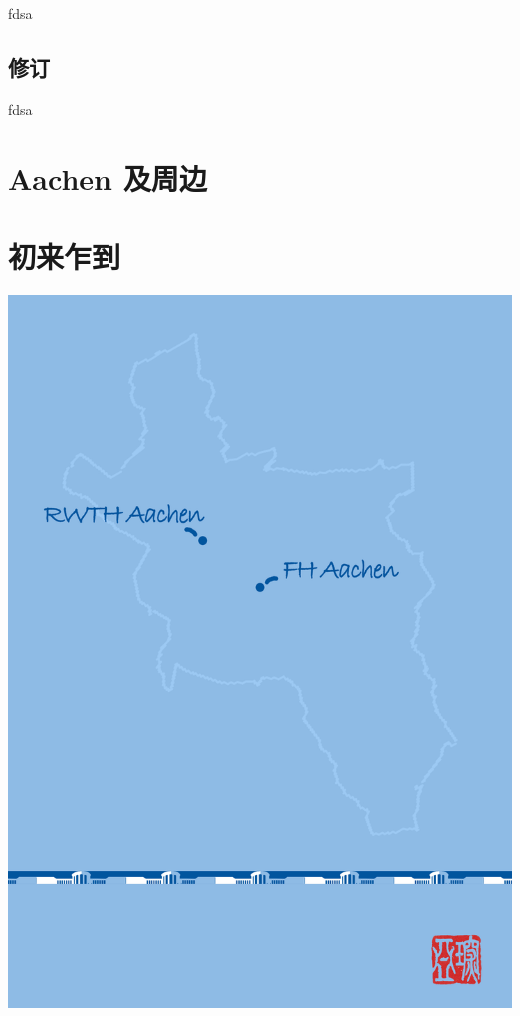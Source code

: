 \documentclass[a4paper,10pt,oneside]{scrbook}
\begin{document}
fdsa


\newpage

\chapter*{修订}

fdsa


\tableofcontents

\mainmatter

\part{Aachen 及周边}




\part{初来乍到}


%
%
%
%
%
%
%


\begin{titlepage}
\parindent=0pt
\includegraphics[width=\linewidth]{Bilder/Back_Cover_.jpg}
\end{titlepage}
\end{document}

